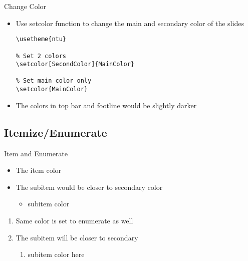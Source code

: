 \documentclass[pdf]{beamer}
\begin{document}
\begin{frame}[fragile]{Change Color}

\begin{itemize}

\item Use \alert{setcolor} function to change the main and secondary color of the slides
    
\begin{lstlisting}[style=tex]
% Use NTU theme
\usetheme{ntu}

% Set 2 colors
\setcolor[SecondColor]{MainColor}

% Set main color only
\setcolor{MainColor}
\end{lstlisting}

\item The colors in top bar and footline would be slightly darker
    
\end{itemize}

\end{frame}

\subsection{Itemize/Enumerate}

\begin{frame}{Item and Enumerate}

    \begin{itemize}
        \item The item color 
        \item The subitem would be closer to secondary color
        \begin{itemize}
            \item subitem color 
        \end{itemize}
        
    \end{itemize}
    
    \begin{enumerate}
        \item Same color is set to enumerate as well
        \item The subitem will be closer to secondary
        \begin{enumerate}
            \item subitem color here
        \end{enumerate}
        
    \end{enumerate}
    
\end{frame}
\end{document}
